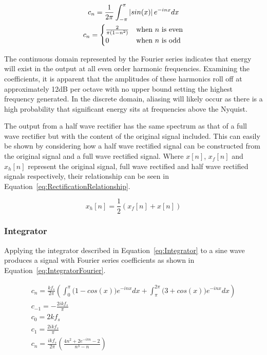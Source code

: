 			\begin{gather}
				c_{n} = \frac{1}{2\pi} \int_{-\pi}^{\pi} \left|sin(x)\right|e^{-inx} dx \nonumber \\
				c_{n} = \begin{cases}
					\frac{2}{\pi(1 - n^{2})} & \text{when $n$ is even} \\
					0 & \text{when $n$ is odd}
				\end{cases}
				\label{eq:RectificationFourier}
			\end{gather}

			The continuous domain represented by the Fourier series indicates that energy will exist in the
			output at all even order harmonic frequencies. Examining the coefficients, it is apparent that the
			amplitudes of these harmonics roll off at approximately 12dB per octave with no upper bound setting
			the highest frequency generated. In the discrete domain, aliasing will likely occur as there is a
			high probability that significant energy sits at frequencies above the Nyquist.

			The output from a half wave rectifier has the same spectrum as that of a full wave rectifier but
			with the content of the original signal included. This can easily be shown by considering how a
			half wave rectified signal can be constructed from the original signal and a full wave rectified
			signal.  Where $x[n]$, $x_{f}[n]$ and $x_{h}[n]$ represent the original signal, full wave rectified
			and half wave rectified signals respectively, their relationship can be seen in
			Equation~\ref{eq:RectificationRelationship}.

			\begin{equation}
				x_{h}[n] = \frac{1}{2} \left( x_{f}[n] + x[n] \right)
				\label{eq:RectificationRelationship}
			\end{equation}

		\subsubsection*{Integrator}
			Applying the integrator described in Equation~\ref{eq:Integrator} to a sine wave produces a signal
			with Fourier series coefficients as shown in Equation~\ref{eq:IntegratorFourier}.

			\begin{gather}
				c_{n} = \frac{kf_{s}}{2\pi} \left( \int_{0}^{\pi} \bigl( 1 - cos(x) \bigr) e^{-inx} dx +
							\int_{\pi}^{2\pi} \bigl( 3 + cos(x) \bigr) 
							e^{-inx} dx \right) \nonumber \\
				c_{-1} = - \frac{2ikf_{s}}{\pi} \nonumber \\
				c_{0} = 2kf_{s} \nonumber \\
				c_{1} = \frac{2ikf_{s}}{\pi} \nonumber \\
				c_{n} = \frac{ikf_{s}}{2\pi} \left( \frac{4n^{2} + 2e^{-i\pi n} - 2}{n^{3} - n} \right)
				\label{eq:IntegratorFourier}
			\end{gather}

